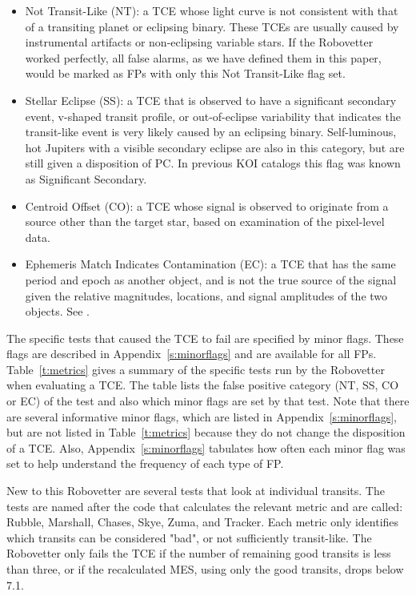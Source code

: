 \begin{itemize}
  \item Not Transit-Like (NT): a TCE whose light curve is not consistent with that of a transiting planet or eclipsing binary. These TCEs are usually caused by instrumental artifacts or non-eclipsing variable stars. If the Robovetter worked perfectly, all false alarms, as we have defined them in this paper, would be marked as FPs with only this Not Transit-Like flag set. 
  \item  Stellar Eclipse (SS): a TCE that is observed to have a significant secondary event, v-shaped transit profile, or out-of-eclipse variability that indicates the transit-like event is very likely caused by an eclipsing binary. Self-luminous, hot Jupiters with a visible secondary eclipse are also in this category, but are still given a disposition of PC. In previous KOI catalogs this flag was known as Significant Secondary.
  \item Centroid Offset (CO): a TCE whose signal is observed to originate from a source other than the target star, based on examination of the pixel-level data.
  \item Ephemeris Match Indicates Contamination (EC): a TCE that has the same period and epoch as another object, and is not the true source of the signal given the relative magnitudes, locations, and signal amplitudes of the two objects. See \citet{Coughlin2014}.
\end{itemize}

The specific tests that caused the TCE to fail are specified by minor flags. These flags are described in Appendix~\ref{s:minorflags} and are available for all FPs.  Table~\ref{t:metrics} gives a summary of the specific tests run by the Robovetter when evaluating a TCE.  The table lists the false positive category (NT, SS, CO or EC) of the test and also which minor flags are set by that test.  Note that there are several informative minor flags, which are listed in Appendix~\ref{s:minorflags}, but are not listed in Table~\ref{t:metrics} because they do not change the disposition of a TCE. Also, Appendix~\ref{s:minorflags} tabulates how often each minor flag was set to help understand the frequency of each type of FP. 

New to this Robovetter are several tests that look at individual transits. The tests are named after the code that calculates the relevant metric and are called: Rubble, Marshall, Chases, Skye, Zuma, and Tracker.  Each metric only identifies which transits can be considered "bad", or not sufficiently transit-like.  The Robovetter only fails the TCE if the number of remaining good transits is less than three, or if the recalculated MES, using only the good transits, drops below 7.1.

